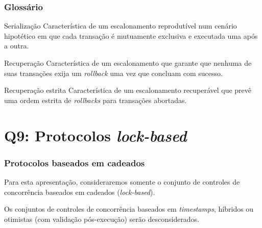 \documentclass{beamer}
\begin{document}
\begin{frame} %
    \frametitle{Glossário}

    \begin{block}{Serialização}
        Característica de um escalonamento reprodutível num cenário hipotético em que cada transação é mutuamente exclusiva e executada uma após a outra.
    \end{block}
    \begin{block}{Recuperação}
        Característica de um escalonamento que garante que nenhuma de suas transações exija um \emph{rollback} uma vez que concluam com sucesso.
       \end{block}
    \begin{block}{Recuperação estrita}
        Característica de um escalonamento recuperável que prevê uma ordem estrita de \emph{rollbacks} para transações abortadas.
    \end{block}
\end{frame}

\section{Q9: Protocolos \emph{lock-based}}

\begin{frame} %
    \frametitle{Protocolos baseados em cadeados}

    Para esta apresentação, consideraremos somente o conjunto de controles de concorrência baseados em cadeados (\emph{lock-based}).

    \medskip

    \newblock        
    Os conjuntos de controles de concorrência baseados em \emph{timestamps}, híbridos ou otimistas (com validação pós-execução) serão desconsiderados.
\end{frame}

\end{document}
